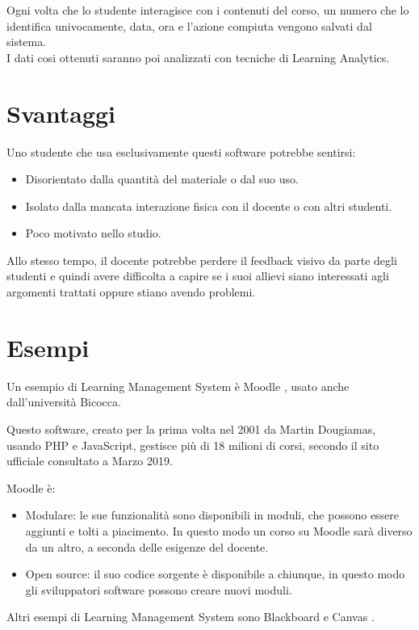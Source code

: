 Ogni volta che lo studente interagisce con i contenuti del corso, un numero che lo identifica univocamente, data, ora e l'azione compiuta vengono salvati dal sistema. \\
I dati cosi ottenuti saranno poi analizzati con tecniche di Learning Analytics.

\cite{Elearningindustry}

\section{Svantaggi}

Uno studente che usa esclusivamente questi software potrebbe sentirsi:

\begin{itemize}

\item Disorientato dalla quantità del materiale o dal suo uso.
\item Isolato dalla mancata interazione fisica con il docente o con altri studenti.
\item Poco motivato nello studio.  

\end{itemize}

Allo stesso tempo, il docente potrebbe perdere il feedback visivo da parte degli studenti e quindi avere difficolta a capire se i suoi allievi 
siano interessati agli argomenti trattati oppure stiano avendo problemi.

\cite{Joomlalms}

\section{Esempi}

Un esempio di Learning Management System è Moodle \cite{moodle}, usato anche dall'università Bicocca.

Questo software, creato per la prima volta nel 2001 da Martin Dougiamas, usando PHP e JavaScript, gestisce più di 18 milioni di corsi, secondo il sito ufficiale consultato a Marzo 2019.

Moodle è: 

\begin{itemize}
\item Modulare: le sue funzionalità sono disponibili in moduli, che possono essere aggiunti e tolti a piacimento. In questo modo un corso su Moodle sarà diverso da un altro, a seconda delle esigenze del docente.
\item Open source: il suo codice sorgente è disponibile a chiunque, in questo modo gli sviluppatori software possono creare nuovi moduli.
\end{itemize}

Altri esempi di Learning Management System sono Blackboard \cite{Blackboard} e Canvas \cite{Canvas}.
